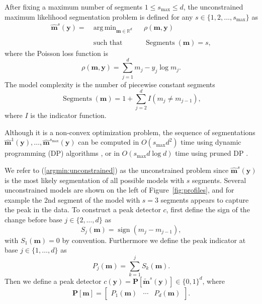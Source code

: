 \documentclass{article}
\DeclareMathOperator*{\argmin}{arg\,min}
\DeclareMathOperator*{\sign}{sign}
\DeclareMathOperator*{\Segments}{Segments}
\newcommand{\RR}{\mathbb R}
\begin{document}
After fixing a maximum number of segments $1 \leq s_{\text{max}}\leq d$,
the unconstrained maximum likelihood segmentation problem is defined
for any $s\in\{1, 2, \dots, s_{\max}\}$ as
\begin{equation}
  \label{argmin:unconstrained}
  \begin{aligned}
    \mathbf{\hat m}^s(\mathbf y)  =\ 
    &\argmin_{\mathbf m\in\RR^{d}} && 
    \rho
    (\mathbf m, \mathbf y) \\
    \\
    &\text{such that} && \Segments(\mathbf m)=s,
  \end{aligned}
\end{equation}
where the Poisson loss function is
\begin{equation}
  \rho(\mathbf m, \mathbf y)= \sum_{j=1}^d m_j - y_j \log m_j.
\end{equation} 
The model complexity is the number of piecewise constant segments
\begin{equation}
  \Segments(\mathbf m)=1+\sum_{j=2}^d I(m_j \neq m_{j-1}),
\end{equation}
where $I$ is the indicator function. 

Although it
is a non-convex optimization problem, the sequence of segmentations
$\mathbf{\hat m}^1(\mathbf y), \dots, \mathbf{\hat
  m}^{s_{\text{max}}}(\mathbf y)$ can be computed in $O(s_{\text{max}}
d^2)$ time using dynamic programming (DP) algorithms \citep{bellman},
or in $O(s_{\text{max}} d \log d)$ time using pruned DP
\citep{pruned-dp, Segmentor}.

We refer to (\ref{argmin:unconstrained}) as the unconstrained problem
since $\mathbf{\hat m}^s(\mathbf y)$ is the most likely segmentation
of all possible models with $s$ segments. Several unconstrained models
are shown on the left of Figure~\ref{fig:profiles}, and for example
the 2nd segment of the model with $s=3$ segments appears to capture
the peak in the data. 
To construct a peak detector $c$, first define the sign of the change
before base $j\in\{2, \dots, d\}$ as
\begin{equation}
  \label{eq:sign}
  S_j(\mathbf m) = \sign( m_{j} - m_{j-1} ),
\end{equation}
with $S_1(\mathbf m)=0$ by convention. Furthermore we define the peak
indicator at base $j\in\{1, \dots, d\}$ as
\begin{equation}
  \label{eq:peaks}
  P_j(\mathbf m) = \sum_{k=1}^j S_k(\mathbf m).
\end{equation}
Then we define a peak detector $c(\mathbf y) = \mathbf P\left[
  \mathbf{\tilde m}^s(\mathbf y) \right]\in\{0, 1\}^d$, where
\begin{equation}
  \mathbf
P[\mathbf m] = \left[\begin{array}{ccc} P_1(\mathbf m) & \cdots &
    P_d(\mathbf m)
\end{array}\right].
\end{equation}
\end{document}
